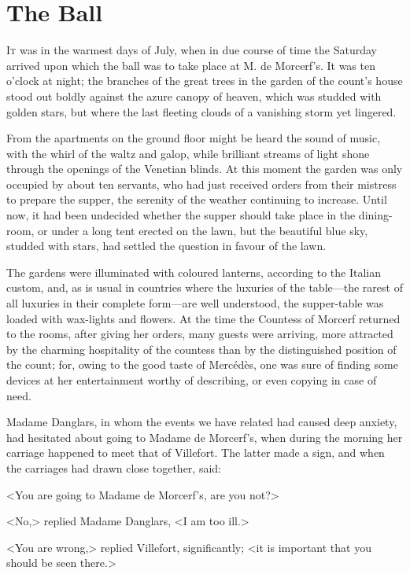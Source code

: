 \chapter{The Ball} 

 \lettrine{I}{t} was in the warmest days of July, when in due course of time the Saturday arrived upon which the ball was to take place at M. de Morcerf's. It was ten o'clock at night; the branches of the great trees in the garden of the count's house stood out boldly against the azure canopy of heaven, which was studded with golden stars, but where the last fleeting clouds of a vanishing storm yet lingered. 

 From the apartments on the ground floor might be heard the sound of music, with the whirl of the waltz and galop, while brilliant streams of light shone through the openings of the Venetian blinds. At this moment the garden was only occupied by about ten servants, who had just received orders from their mistress to prepare the supper, the serenity of the weather continuing to increase. Until now, it had been undecided whether the supper should take place in the dining-room, or under a long tent erected on the lawn, but the beautiful blue sky, studded with stars, had settled the question in favour of the lawn. 

 The gardens were illuminated with coloured lanterns, according to the Italian custom, and, as is usual in countries where the luxuries of the table—the rarest of all luxuries in their complete form—are well understood, the supper-table was loaded with wax-lights and flowers.  At the time the Countess of Morcerf returned to the rooms, after giving her orders, many guests were arriving, more attracted by the charming hospitality of the countess than by the distinguished position of the count; for, owing to the good taste of Mercédès, one was sure of finding some devices at her entertainment worthy of describing, or even copying in case of need. 

 Madame Danglars, in whom the events we have related had caused deep anxiety, had hesitated about going to Madame de Morcerf's, when during the morning her carriage happened to meet that of Villefort. The latter made a sign, and when the carriages had drawn close together, said: 

 <You are going to Madame de Morcerf's, are you not?> 

 <No,> replied Madame Danglars, <I am too ill.> 

 <You are wrong,> replied Villefort, significantly; <it is important that you should be seen there.> 

